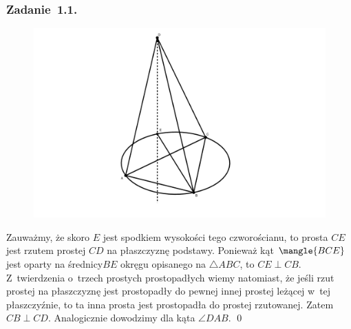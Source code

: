 \subsubsection*{Zadanie~1.1.}
\begin{figure}[H]
    \centering
    \includegraphics[width=\textwidth]{img/2021_01_27/1.png}
\end{figure}
Zauważmy, że skoro \(E\) jest spodkiem wysokości tego czworościanu, to prosta \(CE\) jest rzutem prostej \(CD\) na płaszczyznę podstawy. Ponieważ kąt \(\mangle{BCE}\) jest oparty na średnicy\(BE\) okręgu opisanego na \(\triangle{ABC}\), to \(CE \perp CB\). Z~twierdzenia o~trzech prostych prostopadłych wiemy natomiast, że jeśli rzut prostej na płaszczyznę jest prostopadły do pewnej innej prostej leżącej w~tej płaszczyźnie, to ta inna prosta jest prostopadła do prostej rzutowanej. Zatem \(CB \perp CD\). Analogicznie dowodzimy dla kąta \(\angle{DAB}\).
\qed
